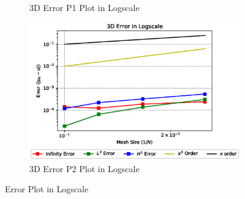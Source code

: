 \documentclass[a4paper,11pt]{article}
\begin{document}
\begin{figure}[h!]
\begin{subfigure}[b]{0.5\linewidth}
		\caption{3D Error P1 Plot in Logscale}
		\label{fig:3derrorP1}
	\end{subfigure}
	\quad
	\begin{subfigure}[b]{0.5\linewidth}
		\centering
		\includegraphics[width=\linewidth]{picture/conference/all3derror}
		\caption{3D Error P2 Plot in Logscale}
		\label{fig:3derrorP2}
	\end{subfigure}
	\caption{Error Plot in Logscale}
	\label{fig:errorplot}
\end{figure}

\newpage
\end{document}
